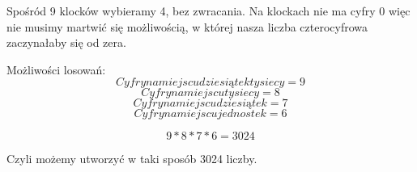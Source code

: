 \textheight=23.7cm \textwidth=17cm  \topmargin=-1.5cm \hoffset=-2cm




\medskip
{} 
\medskip

Spośród 9 klocków wybieramy 4, bez zwracania. Na klockach nie ma cyfry 0 więc nie musimy martwić się możliwością, w której nasza liczba czterocyfrowa zaczynałaby się od zera.

Możliwości losowań:
$$
Cyfry na miejscu dziesiątek tysiecy = 9
$$
$$
Cyfry na miejscu tysiecy = 8
$$
$$
Cyfry na miejscu dziesiątek = 7
$$
$$
Cyfry na miejscu jednostek = 6
$$

$$
9*8*7*6 = 3024
$$

Czyli możemy utworzyć w taki sposób 3024 liczby.


